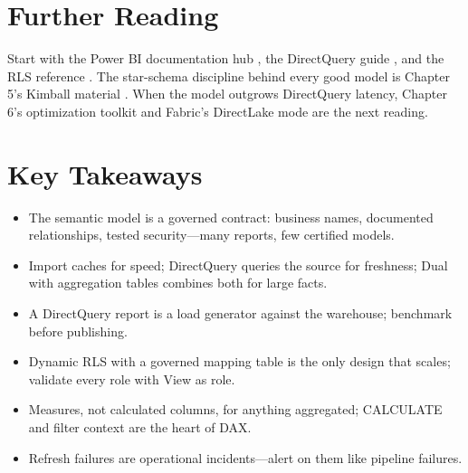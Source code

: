 \section{Further Reading}
Start with the Power BI documentation hub \cite{microsoft2025powerbi}, the DirectQuery guide \cite{microsoft2025directquery}, and the RLS reference \cite{microsoft2025powerbiRLS}. The star-schema discipline behind every good model is Chapter 5's Kimball material \cite{kimball2013dwtk}. When the model outgrows DirectQuery latency, Chapter 6's optimization toolkit and Fabric's DirectLake mode are the next reading.

\section*{Key Takeaways}
\begin{itemize}
    \item The semantic model is a governed contract: business names, documented relationships, tested security---many reports, few certified models.
    \item Import caches for speed; DirectQuery queries the source for freshness; Dual with aggregation tables combines both for large facts.
    \item A DirectQuery report is a load generator against the warehouse; benchmark before publishing.
    \item Dynamic RLS with a governed mapping table is the only design that scales; validate every role with View as role.
    \item Measures, not calculated columns, for anything aggregated; CALCULATE and filter context are the heart of DAX.
    \item Refresh failures are operational incidents---alert on them like pipeline failures.
\end{itemize}

